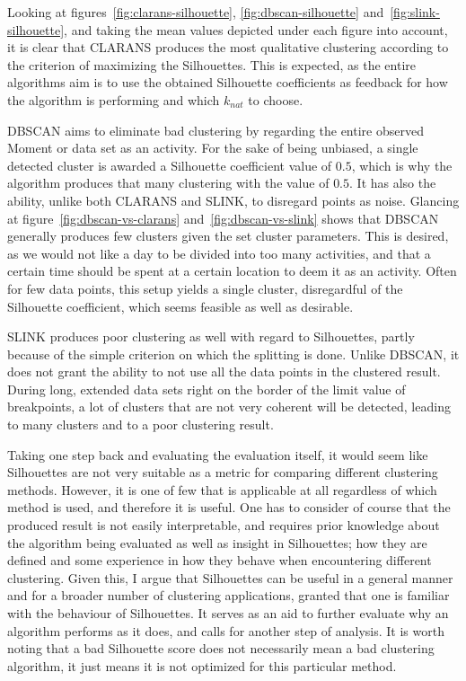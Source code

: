 Looking at figures~\ref{fig:clarans-silhouette}, \ref{fig:dbscan-silhouette} 
and~\ref{fig:slink-silhouette},
and taking the mean values depicted under each figure into account, it is 
clear that CLARANS produces the most qualitative clustering according to 
the criterion of maximizing the Silhouettes. This is expected, as the 
entire algorithms aim is to use the obtained Silhouette coefficients as 
feedback for how the algorithm is performing and which $k_{nat}$ to choose.

DBSCAN aims to eliminate bad clustering by regarding the entire observed 
Moment or data set as an activity. For the sake of being unbiased, a 
single detected cluster is awarded a Silhouette coefficient value of $0.5$,
which is why the algorithm produces that many clustering with the value of 
$0.5$. It has also the ability, unlike both CLARANS and SLINK, to disregard 
points as noise. Glancing at figure~\ref{fig:dbscan-vs-clarans} 
and~\ref{fig:dbscan-vs-slink} shows that DBSCAN generally produces few 
clusters given the set cluster parameters. This is desired, as we would not 
like a day to be divided into too many activities, and that a certain time 
should be spent at a certain location to deem it as an activity. 
Often for few data points, this setup yields a single cluster, disregardful 
of the Silhouette coefficient, which seems feasible as well as desirable.

SLINK produces poor clustering as well with regard to Silhouettes, partly 
because of the simple criterion on which the splitting is done. Unlike 
DBSCAN, it does not grant the ability to not use all the data points in the 
clustered result. During long, extended data sets right on the border of the 
limit value of breakpoints, a lot of clusters that are not very coherent will
be detected, leading to many clusters and to a poor clustering result. 

Taking one step back and evaluating the evaluation itself, it would seem like 
Silhouettes are not very suitable as a metric for comparing different 
clustering methods. However, it is one of few that is applicable 
at all regardless of which method is used, and therefore it is useful. One 
has to consider of course that the produced result is not easily interpretable, 
and requires prior knowledge about the algorithm being 
evaluated as well as insight in Silhouettes; how they are defined and some 
experience in how they behave when encountering different clustering. 
Given this, I argue that Silhouettes can be useful in a general 
manner and for a broader number of clustering applications, granted that 
one is familiar with the behaviour of Silhouettes. It serves as an aid to 
further evaluate why an algorithm performs as it does, and calls for 
another step of analysis. It is worth noting that a bad Silhouette score 
does not necessarily mean a bad clustering algorithm, it just means it is 
not optimized for this particular method.

